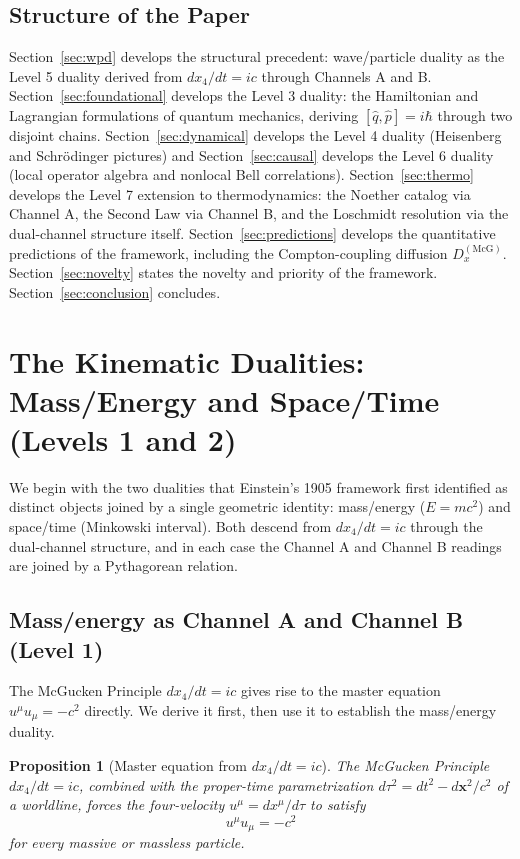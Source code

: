 \documentclass[11pt,a4paper]{article}
\newtheorem{proposition}{Proposition}
\begin{document}
\subsection{Structure of the Paper}

Section~\ref{sec:wpd} develops the structural precedent: wave/particle duality as the Level 5 duality derived from $dx_4/dt = ic$ through Channels A and B. Section~\ref{sec:foundational} develops the Level 3 duality: the Hamiltonian and Lagrangian formulations of quantum mechanics, deriving $[\hat{q}, \hat{p}] = i\hbar$ through two disjoint chains. Section~\ref{sec:dynamical} develops the Level 4 duality (Heisenberg and Schr\"odinger pictures) and Section~\ref{sec:causal} develops the Level 6 duality (local operator algebra and nonlocal Bell correlations). Section~\ref{sec:thermo} develops the Level 7 extension to thermodynamics: the Noether catalog via Channel A, the Second Law via Channel B, and the Loschmidt resolution via the dual-channel structure itself. Section~\ref{sec:predictions} develops the quantitative predictions of the framework, including the Compton-coupling diffusion $D_x^{(\text{McG})}$. Section~\ref{sec:novelty} states the novelty and priority of the framework. Section~\ref{sec:conclusion} concludes.

\section{The Kinematic Dualities: Mass/Energy and Space/Time (Levels 1 and 2)}
\label{sec:kinematic}

We begin with the two dualities that Einstein's 1905 framework first identified as distinct objects joined by a single geometric identity: mass/energy ($E = mc^2$) and space/time (Minkowski interval). Both descend from $dx_4/dt = ic$ through the dual-channel structure, and in each case the Channel A and Channel B readings are joined by a Pythagorean relation.

\subsection{Mass/energy as Channel A and Channel B (Level 1)}

The McGucken Principle $dx_4/dt = ic$ gives rise to the master equation $u^\mu u_\mu = -c^2$ directly. We derive it first, then use it to establish the mass/energy duality.

\begin{proposition}[Master equation from $dx_4/dt = ic$]
\label{prop:master}
The McGucken Principle $dx_4/dt = ic$, combined with the proper-time parametrization $d\tau^2 = dt^2 - d\mathbf{x}^2/c^2$ of a worldline, forces the four-velocity $u^\mu = dx^\mu/d\tau$ to satisfy
\begin{equation}
\boxed{u^\mu u_\mu = -c^2}
\label{eq:master}
\end{equation}
for every massive or massless particle.
\end{proposition}
\end{document}
